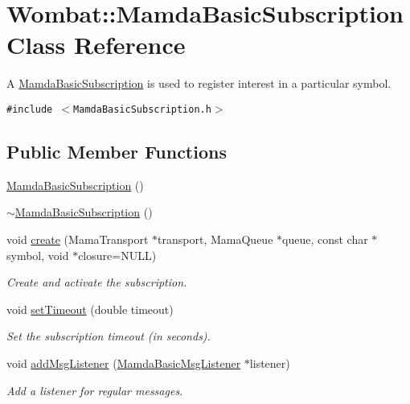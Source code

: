 \hypertarget{classWombat_1_1MamdaBasicSubscription}{
\section{Wombat::Mamda\-Basic\-Subscription Class Reference}
\label{classWombat_1_1MamdaBasicSubscription}
}
A \hyperlink{classWombat_1_1MamdaBasicSubscription}{Mamda\-Basic\-Subscription} is used to register interest in a particular symbol.  


{\tt \#include $<$Mamda\-Basic\-Subscription.h$>$}

\subsection*{Public Member Functions}
\begin{CompactItemize}
\item 
\hyperlink{classWombat_1_1MamdaBasicSubscription_65cfae1eec84ef7ca6cc8861408d1c20}{Mamda\-Basic\-Subscription} ()
\item 
\hyperlink{classWombat_1_1MamdaBasicSubscription_32f280431e1a02439d2c6e81f619d7d1}{$\sim$Mamda\-Basic\-Subscription} ()
\item 
void \hyperlink{classWombat_1_1MamdaBasicSubscription_3c27e4c6bf7b6c23464049840aff22e0}{create} (Mama\-Transport $\ast$transport, Mama\-Queue $\ast$queue, const char $\ast$symbol, void $\ast$closure=NULL)
\begin{CompactList}\small\item\em Create and activate the subscription. \item\end{CompactList}\item 
void \hyperlink{classWombat_1_1MamdaBasicSubscription_8c1d89cc23a0231367c494c780c9bf60}{set\-Timeout} (double timeout)
\begin{CompactList}\small\item\em Set the subscription timeout (in seconds). \item\end{CompactList}\item 
void \hyperlink{classWombat_1_1MamdaBasicSubscription_85589ccc88a8e13160b56060fd97450c}{add\-Msg\-Listener} (\hyperlink{classWombat_1_1MamdaBasicMsgListener}{Mamda\-Basic\-Msg\-Listener} $\ast$listener)
\begin{CompactList}\small\item\em Add a listener for regular messages. \item\end{CompactList}\item 

\end{CompactItemize}
